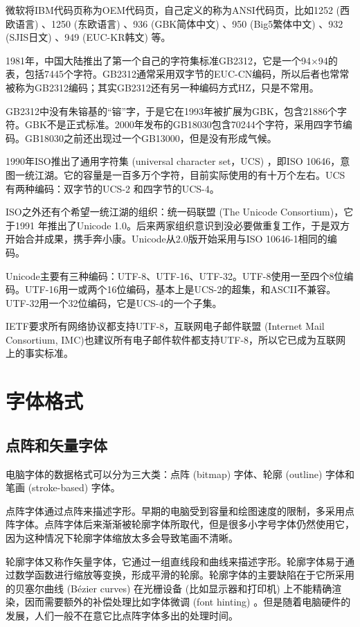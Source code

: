 微软\indexMSFT 将IBM代码页称为OEM代码页，自己定义的称为ANSI代码页，比如1252 (西欧语言) 、1250 (东欧语言) 、936 (GBK简体中文) 、950 (Big5繁体中文) 、932 (SJIS日文) 、949 (EUC-KR韩文) 等。

1981年，中国大陆推出了第一个自己的字符集标准GB2312，它是一个94×94的表，包括7445个字符。GB2312通常采用双字节的EUC-CN编码，所以后者也常常被称为GB2312编码；其实GB2312还有另一种编码方式HZ，只是不常用。

GB2312中没有朱镕基的“镕”字，于是它在1993年被扩展为GBK，包含21886个字符。GBK不是正式标准。2000年发布的GB18030包含70244个字符，采用四字节编码。GB18030之前还出现过一个GB13000，但是没有形成气候。

1990年ISO推出了通用字符集 (universal character set，UCS) ，即ISO 10646，意图一统江湖。它的容量是一百多万个字符，目前实际使用的有十万个左右。UCS有两种编码：双字节的UCS-2 和四字节的UCS-4。

ISO之外还有个希望一统江湖的组织：统一码联盟 (The Unicode Consortium)\indexUnicode ，它于1991 年推出了Unicode 1.0。后来两家组织意识到没必要做重复工作，于是双方开始合并成果，携手奔小康。Unicode从2.0版开始采用与ISO 10646-1相同的编码。

Unicode主要有三种编码：UTF-8、UTF-16、UTF-32。UTF-8使用一至四个8位编码。UTF-16用一或两个16位编码，基本上是UCS-2的超集，和ASCII不兼容。UTF-32用一个32位编码，它是UCS-4的一个子集。

IETF\indexIETF 要求所有网络协议都支持UTF-8，互联网电子邮件联盟 (Internet Mail Consortium, IMC)\indexIMC 也建议所有电子邮件软件都支持UTF-8，所以它已成为互联网上的事实标准。

\section{字体格式}

\subsection{点阵和矢量字体}

电脑字体的数据格式可以分为三大类：点阵 (bitmap) 字体、轮廓 (outline) 字体和笔画 (stroke-based) 字体。

点阵字体通过点阵来描述字形。早期的电脑受到容量和绘图速度的限制，多采用点阵字体。点阵字体后来渐渐被轮廓字体所取代，但是很多小字号字体仍然使用它，因为这种情况下轮廓字体缩放太多会导致笔画不清晰。

轮廓字体又称作矢量字体，它通过一组直线段和曲线来描述字形。轮廓字体易于通过数学函数进行缩放等变换，形成平滑的轮廓。轮廓字体的主要缺陷在于它所采用的贝塞尔曲线 (Bézier curves) 在光栅设备 (比如显示器和打印机) 上不能精确渲染，因而需要额外的补偿处理比如字体微调 (font hinting) 。但是随着电脑硬件的发展，人们一般不在意它比点阵字体多出的处理时间。

